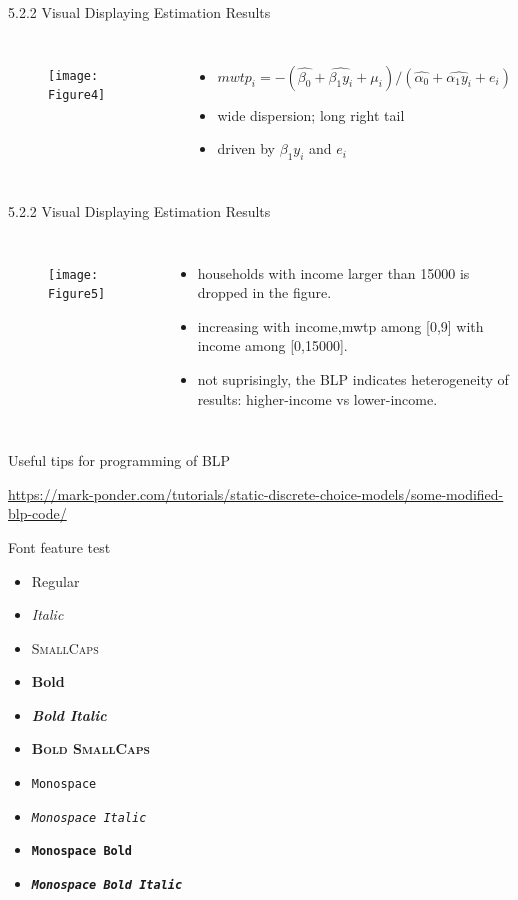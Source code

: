 \documentclass[10pt]{beamer}
\begin{document}
\begin{frame}{5.2.2 Visual Displaying Estimation Results}
    \begin{columns}[c] 
    \column{9cm}
    \begin{figure}
        \centering
        \texttt{[image: Figure4]}
    \end{figure}
    \column{4cm}
    \begin{itemize}
        \item $mwtp_i = -(\hat{\beta_0}+\hat{\beta_1 y_i}+\mu_i)/(\hat{\alpha_0}+\hat{\alpha_1 y_i}+e_i)$
        \item wide dispersion; long right tail
        \item driven by $\beta_1 y_i$ and $e_i$
    \end{itemize}
	\end{columns}
\end{frame}
\begin{frame}{5.2.2 Visual Displaying Estimation Results}
    \begin{columns}[c] 
    \column{9cm}
    \begin{figure}
        \centering
        \texttt{[image: Figure5]}
    \end{figure}
    \column{4cm}
    \begin{itemize}
        \item households with income larger than 15000 is dropped in the figure.
        \item increasing with income,mwtp among [0,9] with income among [0,15000].
        \item not suprisingly, the BLP indicates heterogeneity of results: higher-income vs lower-income.
    \end{itemize}
	\end{columns}
\end{frame}
\begin{frame}{Useful tips for programming of BLP}
    \item \url{https://mark-ponder.com/tutorials/static-discrete-choice-models/some-modified-blp-code/}
\end{frame}
\begin{frame}{Font feature test}
  \begin{itemize}
    \item Regular
    \item \textit{Italic}
    \item \textsc{SmallCaps}
    \item \textbf{Bold}
    \item \textbf{\textit{Bold Italic}}
    \item \textbf{\textsc{Bold SmallCaps}}
    \item \texttt{Monospace}
    \item \texttt{\textit{Monospace Italic}}
    \item \texttt{\textbf{Monospace Bold}}
    \item \texttt{\textbf{\textit{Monospace Bold Italic}}}
  \end{itemize}
\end{frame}
\end{document}
